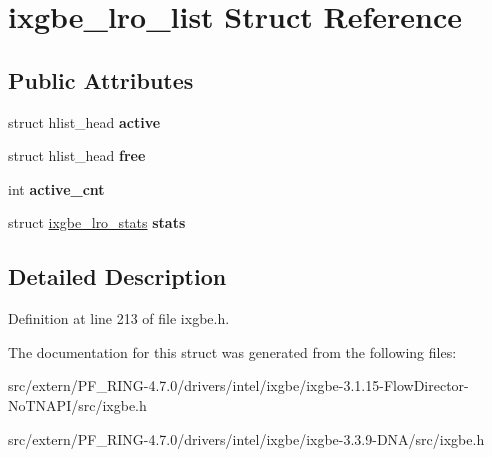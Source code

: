 \hypertarget{structixgbe__lro__list}{
\section{ixgbe\_\-lro\_\-list Struct Reference}
\label{structixgbe__lro__list}
}
\subsection*{Public Attributes}
\begin{DoxyCompactItemize}
\item 
\hypertarget{structixgbe__lro__list_a483022fe0a661ac98598d72ce7fd2af5}{
struct hlist\_\-head {\bfseries active}}
\label{structixgbe__lro__list_a483022fe0a661ac98598d72ce7fd2af5}

\item 
\hypertarget{structixgbe__lro__list_a86ce5947ece6ec7aba46027e12d552b4}{
struct hlist\_\-head {\bfseries free}}
\label{structixgbe__lro__list_a86ce5947ece6ec7aba46027e12d552b4}

\item 
\hypertarget{structixgbe__lro__list_a6b8c41c7092a9df9840e8527642df9bf}{
int {\bfseries active\_\-cnt}}
\label{structixgbe__lro__list_a6b8c41c7092a9df9840e8527642df9bf}

\item 
\hypertarget{structixgbe__lro__list_a3316601c9c6a799675a28e6fc555f9bb}{
struct \hyperlink{structixgbe__lro__stats}{ixgbe\_\-lro\_\-stats} {\bfseries stats}}
\label{structixgbe__lro__list_a3316601c9c6a799675a28e6fc555f9bb}

\end{DoxyCompactItemize}


\subsection{Detailed Description}


Definition at line 213 of file ixgbe.h.



The documentation for this struct was generated from the following files:\begin{DoxyCompactItemize}
\item 
src/extern/PF\_\-RING-\/4.7.0/drivers/intel/ixgbe/ixgbe-\/3.1.15-\/FlowDirector-\/NoTNAPI/src/ixgbe.h\item 
src/extern/PF\_\-RING-\/4.7.0/drivers/intel/ixgbe/ixgbe-\/3.3.9-\/DNA/src/ixgbe.h\end{DoxyCompactItemize}
